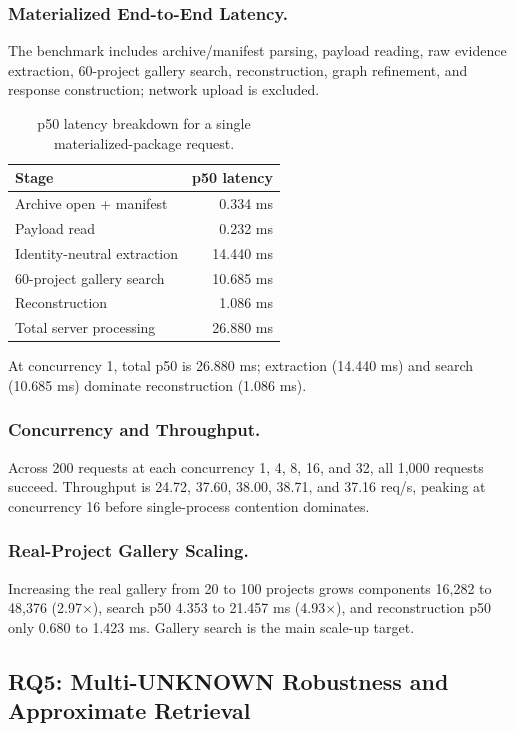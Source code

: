 \documentclass[runningheads]{llncs}
\begin{document}
\subsubsection{Materialized End-to-End Latency.}
The benchmark includes archive/manifest parsing, payload reading, raw evidence extraction, 60-project gallery search, reconstruction, graph refinement, and response construction; network upload is excluded.
\begin{table}[!htbp]
\centering
\caption{p50 latency breakdown for a single materialized-package request.}
\label{tab:latency}
\scriptsize
\begin{tabular}{lr}
\toprule
Stage & p50 latency\\
\midrule
Archive open + manifest & 0.334 ms\\
Payload read & 0.232 ms\\
Identity-neutral extraction & 14.440 ms\\
60-project gallery search & 10.685 ms\\
Reconstruction & 1.086 ms\\
Total server processing & 26.880 ms\\
\bottomrule
\end{tabular}
\end{table}
At concurrency 1, total p50 is 26.880 ms; extraction (14.440 ms) and search (10.685 ms) dominate reconstruction (1.086 ms).

\subsubsection{Concurrency and Throughput.}
Across 200 requests at each concurrency 1, 4, 8, 16, and 32, all 1,000 requests succeed. Throughput is 24.72, 37.60, 38.00, 38.71, and 37.16 req/s, peaking at concurrency 16 before single-process contention dominates.

\subsubsection{Real-Project Gallery Scaling.}
Increasing the real gallery from 20 to 100 projects grows components 16,282 to 48,376 (2.97$\times$), search p50 4.353 to 21.457 ms (4.93$\times$), and reconstruction p50 only 0.680 to 1.423 ms. Gallery search is the main scale-up target.

\subsection{RQ5: Multi-UNKNOWN Robustness and Approximate Retrieval}
\end{document}
